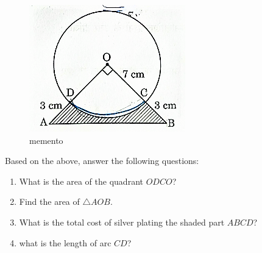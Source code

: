 \begin{enumerate}
\begin{figure}[!ht]
    \centering
    \includegraphics[width=\columnwidth]{figs/30_2_1_Q36.png}
    \caption{memento}
    \label{fig:30_2_1_Q36}
\end{figure}

Based on the above, answer the following questions:
\begin{enumerate}[label=(\roman*)]
    \item What is the area of the quadrant $ODCO$?
    \item Find the area of $\triangle  AOB$.
    \item What is the total cost of silver plating the shaded part $ABCD$?
    \item what is the length of arc $CD$?
\end{enumerate}


\end{enumerate}
%











